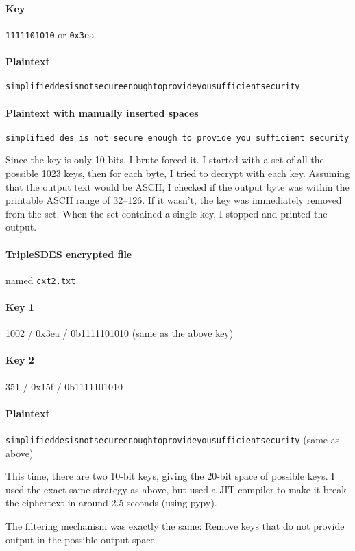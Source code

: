 \documentclass[a4paper,english,12pt]{article}
\begin{document}
\paragraph{Key} \texttt{1111101010} or \texttt{0x3ea}

\paragraph{Plaintext}
\texttt{simplifieddesisnotsecureenoughtoprovideyousufficientsecurity}

\paragraph{Plaintext with manually inserted spaces}
\texttt{simplified des is not secure enough to provide you sufficient security}

Since the key is only 10 bits, I brute-forced it. I started with a set of all
the possible 1023 keys, then for each byte, I tried to decrypt with each key.
Assuming that the output text would be ASCII, I checked if the output byte was
within the printable ASCII range of 32--126. If it wasn't, the key was
immediately removed from the set. When the set contained a single key, I
stopped and printed the output.

\paragraph{TripleSDES encrypted file} named \texttt{cxt2.txt}

\paragraph{Key 1} 1002 / 0x3ea / 0b1111101010 (same as the above key)
\paragraph{Key 2} 351 / 0x15f / 0b1111101010
\paragraph{Plaintext}
\texttt{simplifieddesisnotsecureenoughtoprovideyousufficientsecurity} (same as
above)

This time, there are two 10-bit keys, giving the 20-bit space of possible keys.
I used the exact same strategy as above, but used a JIT-compiler to make it
break the ciphertext in around 2.5 seconds (using pypy).

The filtering mechanism was exactly the same: Remove keys that do not provide
output in the possible output space.
\end{document}
